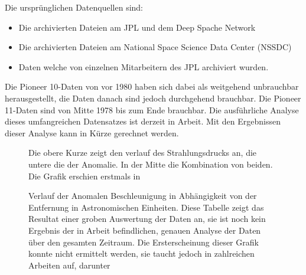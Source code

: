 Die ursprünglichen Datenquellen sind: %
\begin{itemize}
\item Die archivierten Dateien am JPL und dem Deep Spache Network
\item Die archivierten Dateien am National Space Science Data Center (NSSDC)
\item Daten welche von einzelnen Mitarbeitern des JPL archiviert wurden.
\end{itemize}
Die Pioneer 10-Daten von vor 1980 haben sich dabei als weitgehend unbrauchbar herausgestellt, die Daten danach sind jedoch durchgehend brauchbar. Die Pioneer 11-Daten sind von Mitte 1978 bis zum Ende brauchbar. Die ausführliche Analyse dieses umfangreichen Datensatzes ist derzeit in Arbeit.\cite{Turyshev2010} Mit den Ergebnissen dieser Analyse kann in Kürze gerechnet werden. %

\begin{figure}[htnb]
\begin{center}
\noindent    
{}
\end{center}
\vskip -10pt
  \caption{
Die obere Kurze zeigt den verlauf des Strahlungsdrucks an, die untere die der Anomalie. In der Mitte die Kombination von beiden. Die Grafik erschien erstmals in \cite{Anderson1992}}
\label{fig:forces}
\end{figure} 

\begin{figure}[htnb]
\begin{center}
\noindent    
{}
\end{center}
\vskip -10pt
  \caption{
Verlauf der Anomalen Beschleunigung in Abhängigkeit von der Entfernung in Astronomischen Einheiten. Diese Tabelle zeigt das Resultat einer groben Auswertung der Daten an, sie ist noch kein Ergebnis der in Arbeit befindlichen, genauen Analyse der Daten über den gesamten Zeitraum. Die Ersterscheinung dieser Grafik konnte nicht ermittelt werden, sie taucht jedoch in zahlreichen Arbeiten auf, darunter\cite{Anderson2002}\cite{Nieto2005}
}
\label{fig:anomalie}
\end{figure} 

